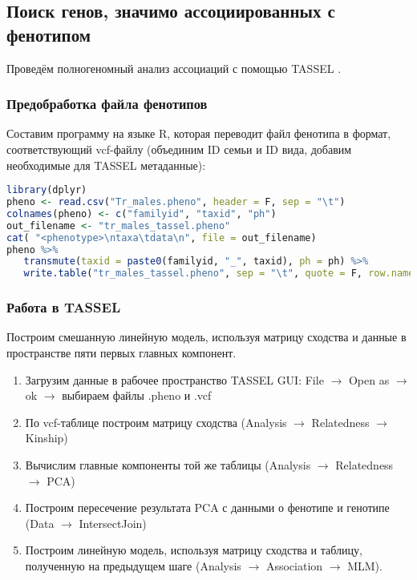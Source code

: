 \documentclass[a4paper,12pt]{article}
\begin{document}
\subsection{Поиск генов, значимо ассоциированных с фенотипом}

Проведём полногеномный анализ ассоциаций с помощью TASSEL \cite{tassel}.

\subsubsection{Предобработка файла фенотипов}

Составим программу на языке R, которая переводит файл фенотипа в формат, соответствующий vcf-файлу (объединим ID семьи и ID вида, добавим необходимые для TASSEL метаданные):

\begin{lstlisting}[language=R]
library(dplyr)
pheno <- read.csv("Tr_males.pheno", header = F, sep = "\t")
colnames(pheno) <- c("familyid", "taxid", "ph")
out_filename <- "tr_males_tassel.pheno"
cat( "<phenotype>\ntaxa\tdata\n", file = out_filename)
pheno %>%
   transmute(taxid = paste0(familyid, "_", taxid), ph = ph) %>%
   write.table("tr_males_tassel.pheno", sep = "\t", quote = F, row.names = F, append = T)
\end{lstlisting}

\subsubsection{Работа в TASSEL}

Построим смешанную линейную модель, используя матрицу сходства и данные в пространстве пяти первых главных компонент.

\begin{enumerate}[noitemsep]
    \item Загрузим данные в рабочее пространство TASSEL GUI: File $\rightarrow$ Open as $\rightarrow$ ok $\rightarrow$ выбираем файлы .pheno и .vcf
    \item По vcf-таблице построим матрицу сходства (Analysis $\rightarrow$ Relatedness $\rightarrow$ Kinship)
    \item Вычислим главные компоненты той же таблицы (Analysis $\rightarrow$ Relatedness $\rightarrow$ PCA)
    \item Построим пересечение результата PCA с данными о фенотипе и генотипе (Data $\rightarrow$ IntersectJoin)
    \item Построим линейную модель, используя матрицу сходства и таблицу, полученную на предыдущем шаге (Analysis $\rightarrow$ Association $\rightarrow$ MLM).
\end{enumerate}
\end{document}
